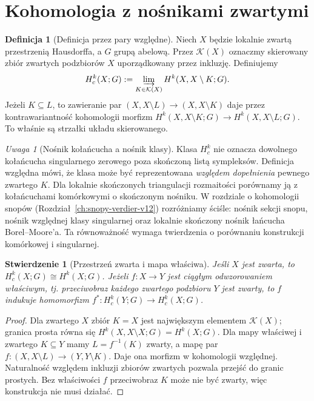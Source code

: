 \documentclass[11pt,a4paper,oneside]{report}
\theoremstyle{plain}
\newtheorem{stwierdzenie}[twierdzenie]{Stwierdzenie}
\theoremstyle{definition}
\newtheorem{definicja}[twierdzenie]{Definicja}
\theoremstyle{remark}
\newtheorem{uwaga}[twierdzenie]{Uwaga}
\begin{document}
\section{Kohomologia z nośnikami zwartymi}
\begin{definicja}[Definicja przez pary względne]
\label{def:compact-support-cohom-v11}
Niech $X$ będzie lokalnie zwartą przestrzenią Hausdorffa,
a $G$ grupą abelową. Przez $\mathcal K(X)$ oznaczmy
skierowany zbiór zwartych podzbiorów $X$ uporządkowany
przez inkluzję. Definiujemy
\[
H_c^k(X;G):=\varinjlim_{K\in\mathcal K(X)}
H^k(X,X\setminus K;G).
\]
Jeżeli $K\subseteq L$, to zawieranie par
$(X,X\setminus L)\to(X,X\setminus K)$ daje przez
kontrawariantność kohomologii morfizm
$H^k(X,X\setminus K;G)\to H^k(X,X\setminus L;G)$.
To właśnie są strzałki układu skierowanego.
\end{definicja}

\begin{uwaga}[Nośnik kołańcucha a nośnik klasy]
Klasa $H_c^k$ nie oznacza dowolnego kołańcucha singularnego
zerowego poza skończoną listą sympleksów. Definicja względna
mówi, że klasa może być reprezentowana \emph{względem dopełnienia}
pewnego zwartego $K$. Dla lokalnie skończonych triangulacji
rozmaitości porównamy ją z kołańcuchami komórkowymi o skończonym
nośniku. W rozdziale o kohomologii snopów (Rozdział~\ref{ch:snopy-verdier-v12}) rozróżniamy
ściśle: nośnik sekcji snopu, nośnik względnej klasy
singularnej oraz lokalnie skończony nośnik łańcucha Borel--Moore'a. Ta równoważność wymaga twierdzenia o porównaniu
konstrukcji komórkowej i singularnej.
\end{uwaga}

\begin{stwierdzenie}[Przestrzeń zwarta i mapa właściwa]
\label{prop:compact-proper-v11}
Jeśli $X$ jest zwarta, to $H_c^k(X;G)\cong H^k(X;G)$.
Jeżeli $f:X\to Y$ jest ciągłym odwzorowaniem \emph{właściwym},
tj. przeciwobraz każdego zwartego podzbioru $Y$ jest zwarty,
to $f$ indukuje homomorfizm
$f^*:H_c^k(Y;G)\to H_c^k(X;G)$.
\end{stwierdzenie}
\begin{proof}
Dla zwartego $X$ zbiór $K=X$ jest największym elementem
$\mathcal K(X)$; granica prosta równa się
$H^k(X,X\setminus X;G)=H^k(X;G)$.
Dla mapy właściwej i zwartego $K\subseteq Y$ mamy
$L=f^{-1}(K)$ zwarty, a mapę par
$f:(X,X\setminus L)\to(Y,Y\setminus K)$.
Daje ona morfizm w kohomologii względnej. Naturalność
względem inkluzji zbiorów zwartych pozwala przejść
do granic prostych. Bez właściwości $f$ przeciwobraz
$K$ może nie być zwarty, więc konstrukcja nie musi działać.
\end{proof}
\end{document}
